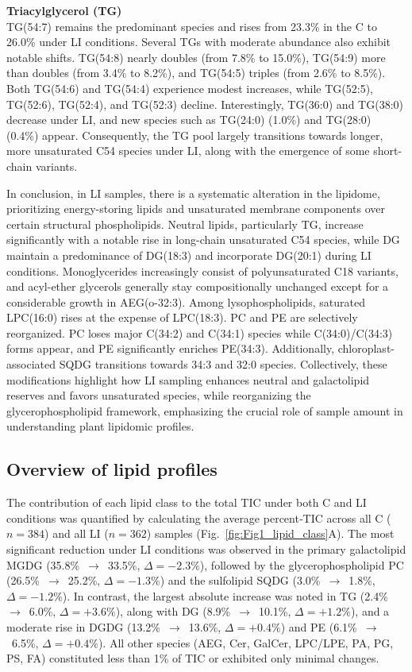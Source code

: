 \documentclass[10pt,letterpaper]{article}
\begin{document}
\textbf{Triacylglycerol (TG)}  \\
TG(54:7) remains the predominant species and rises from 23.3\% in the C to 26.0\% under LI conditions. Several TGs with moderate abundance also exhibit notable shifts. TG(54:8) nearly doubles (from 7.8\% to 15.0\%), TG(54:9) more than doubles (from 3.4\% to 8.2\%), and TG(54:5) triples (from 2.6\% to 8.5\%). Both TG(54:6) and TG(54:4) experience modest increases, while TG(52:5), TG(52:6), TG(52:4), and TG(52:3) decline. Interestingly, TG(36:0) and TG(38:0) decrease under LI, and new species such as TG(24:0) (1.0\%) and TG(28:0) (0.4\%) appear. Consequently, the TG pool largely transitions towards longer, more unsaturated C54 species under LI, along with the emergence of some short-chain variants.

\bigskip

In conclusion, in LI samples, there is a systematic alteration in the lipidome, prioritizing energy-storing lipids and unsaturated membrane components over certain structural phospholipids. Neutral lipids, particularly TG, increase significantly with a notable rise in long-chain unsaturated C54 species, while DG maintain a predominance of DG(18:3) and incorporate DG(20:1) during LI conditions. Monoglycerides increasingly consist of polyunsaturated C18 variants, and acyl-ether glycerols generally stay compositionally unchanged except for a considerable growth in AEG(o-32:3). Among lysophospholipids, saturated LPC(16:0) rises at the expense of LPC(18:3). PC and PE are selectively reorganized. PC loses major C(34:2) and C(34:1) species while C(34:0)/C(34:3) forms appear, and PE significantly enriches PE(34:3). Additionally, chloroplast-associated SQDG transitions towards 34:3 and 32:0 species. Collectively, these modifications highlight how LI sampling enhances neutral and galactolipid reserves and favors unsaturated species, while reorganizing the glycerophospholipid framework, emphasizing the crucial role of sample amount in understanding plant lipidomic profiles.


\subsection*{Overview of lipid profiles}
The contribution of each lipid class to the total TIC under both C and LI conditions was quantified by calculating the average percent‐TIC across all C (\(n = 384\)) and all LI (\(n = 362\)) samples (Fig.~\ref{fig:Fig1_lipid_class}A). The most significant reduction under LI conditions was observed in the primary galactolipid MGDG (35.8\%~\(\rightarrow\)~33.5\%, \(\Delta = -2.3\%\)), followed by the glycerophospholipid PC (26.5\%~\(\rightarrow\)~25.2\%, \(\Delta = -1.3\%\)) and the sulfolipid SQDG (3.0\%~\(\rightarrow\)~1.8\%, \(\Delta = -1.2\%\)). In contrast, the largest absolute increase was noted in TG (2.4\%~\(\rightarrow\)~6.0\%, \(\Delta = +3.6\%\)), along with DG (8.9\%~\(\rightarrow\)~10.1\%, \(\Delta = +1.2\%\)), and a moderate rise in DGDG (13.2\%~\(\rightarrow\)~13.6\%, \(\Delta = +0.4\%\)) and PE (6.1\%~\(\rightarrow\)~6.5\%, \(\Delta = +0.4\%\)). All other species (AEG, Cer, GalCer, LPC/LPE, PA, PG, PS, FA) constituted less than 1\% of TIC or exhibited only minimal changes.
\end{document}
